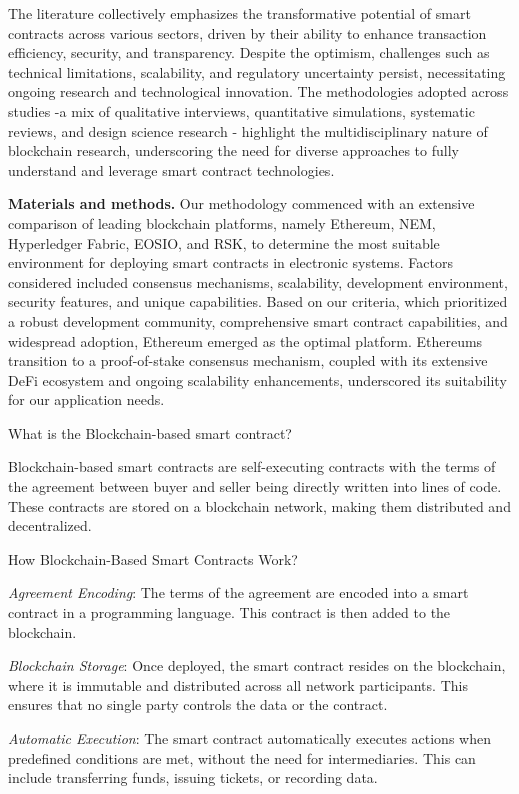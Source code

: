 The literature collectively emphasizes the transformative potential of
smart contracts across various sectors, driven by their ability to
enhance transaction efficiency, security, and transparency. Despite the
optimism, challenges such as technical limitations, scalability, and
regulatory uncertainty persist, necessitating ongoing research and
technological innovation. The methodologies adopted across studies -a
mix of qualitative interviews, quantitative simulations, systematic
reviews, and design science research - highlight the multidisciplinary
nature of blockchain research, underscoring the need for diverse
approaches to fully understand and leverage smart contract technologies.

\textbf{Materials and methods.} Our methodology commenced with an
extensive comparison of leading blockchain platforms, namely Ethereum,
NEM, Hyperledger Fabric, EOSIO, and RSK, to determine the most suitable
environment for deploying smart contracts in electronic systems. Factors
considered included consensus mechanisms, scalability, development
environment, security features, and unique capabilities. Based on our
criteria, which prioritized a robust development community,
comprehensive smart contract capabilities, and widespread adoption,
Ethereum emerged as the optimal platform. Ethereum\textquotesingle s
transition to a proof-of-stake consensus mechanism, coupled with its
extensive DeFi ecosystem and ongoing scalability enhancements,
underscored its suitability for our application needs.

What is the Blockchain-based smart contract?

Blockchain-based smart contracts are self-executing contracts with the
terms of the agreement between buyer and seller being directly written
into lines of code. These contracts are stored on a blockchain network,
making them distributed and decentralized.

How Blockchain-Based Smart Contracts Work?

\emph{Agreement Encoding}: The terms of the agreement are encoded into a
smart contract in a programming language. This contract is then added to
the blockchain.

\emph{Blockchain Storage}: Once deployed, the smart contract resides on
the blockchain, where it is immutable and distributed across all network
participants. This ensures that no single party controls the data or the
contract.

\emph{Automatic Execution}: The smart contract automatically executes
actions when predefined conditions are met, without the need for
intermediaries. This can include transferring funds, issuing tickets, or
recording data.

